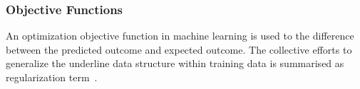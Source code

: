 \subsubsection{Objective Functions}
An optimization objective function in machine learning is used to the difference between the predicted outcome and expected outcome. The collective efforts to generalize the underline data structure within training data is summarised as regularization term~\cite{goodfellow_2015}.  